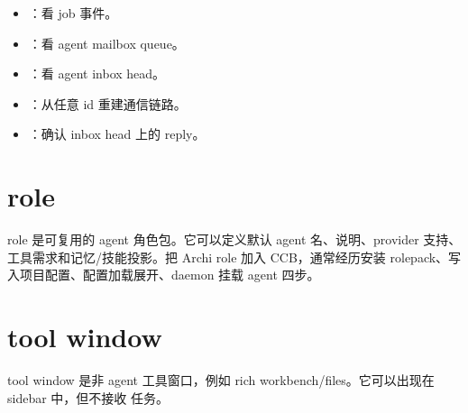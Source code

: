 \begin{itemize}
  \item {}：看 job 事件。
  \item {}：看 agent mailbox queue。
  \item {}：看 agent inbox head。
  \item {}：从任意 id 重建通信链路。
  \item {}：确认 inbox head 上的 reply。
\end{itemize}

\section{role}

role 是可复用的 agent 角色包。它可以定义默认 agent 名、说明、provider 支持、工具需求和记忆/技能投影。把 Archi role 加入 CCB，通常经历安装 rolepack、写入项目配置、配置加载展开、daemon 挂载 agent 四步。

\section{tool window}

tool window 是非 agent 工具窗口，例如 rich workbench/files。它可以出现在 sidebar 中，但不接收  任务。
